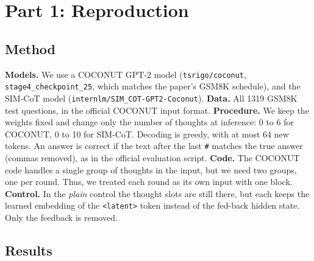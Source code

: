 \documentclass[10pt,letterpaper]{article}
\newcommand{\step}[1]{\texttt{\small #1}}
\begin{document}
\section{Part 1: Reproduction}

\subsection{Method}
\textbf{Models.}  We use a COCONUT GPT-2 model (\texttt{tsrigo/coconut}, \texttt{stage4\_checkpoint\_25}, which matches the paper's GSM8K schedule), and the
SIM-CoT model (\texttt{internlm/SIM\_COT-GPT2-Coconut}). \newline
\textbf{Data.} All 1319 GSM8K test questions, in the official COCONUT input format. \newline
\textbf{Procedure.} We keep the weights fixed and change only the number of thoughts at inference: 0 to 6 for
COCONUT, 0 to 10 for SIM-CoT. Decoding is greedy, with at most 64 new tokens. An answer is correct if the text after
the last \step{\#} matches the true answer (commas removed), as in the official evaluation script. \newline
\textbf{Code.} The COCONUT code handles a single group of thoughts in the input, but we need two groups, one per round. Thus, we treated each round as its own input with one block.
\textbf{Control.} In the \emph{plain} control the thought slots are still there, but each keeps the learned embedding
of the \step{<latent>} token instead of the fed-back hidden state. Only the feedback is removed.

\subsection{Results}
\end{document}
